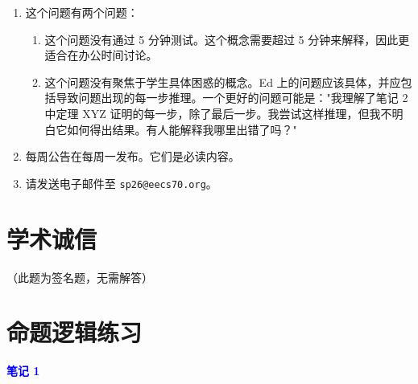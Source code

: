 \documentclass[11pt,a4paper]{article}
\begin{document}
\begin{enumerate}[label=(\alph*)]
    \item \begin{solutionbox}
        这个问题有两个问题：
        \begin{enumerate}[label=\arabic*.]
            \item 这个问题没有通过 5 分钟测试。这个概念需要超过 5 分钟来解释，因此更适合在办公时间讨论。
            \item 这个问题没有聚焦于学生具体困惑的概念。Ed 上的问题应该具体，并应包括导致问题出现的每一步推理。一个更好的问题可能是："我理解了笔记 2 中定理 XYZ 证明的每一步，除了最后一步。我尝试这样推理，但我不明白它如何得出结果。有人能解释我哪里出错了吗？"
        \end{enumerate}
    \end{solutionbox}
    
    \item 每周公告在每周一发布。它们是必读内容。
    
    \item 请发送电子邮件至 \texttt{sp26@eecs70.org}。
\end{enumerate}

\section{学术诚信}

（此题为签名题，无需解答）

\section{命题逻辑练习}

\textcolor{blue}{\textbf{笔记 1}}
\end{document}
